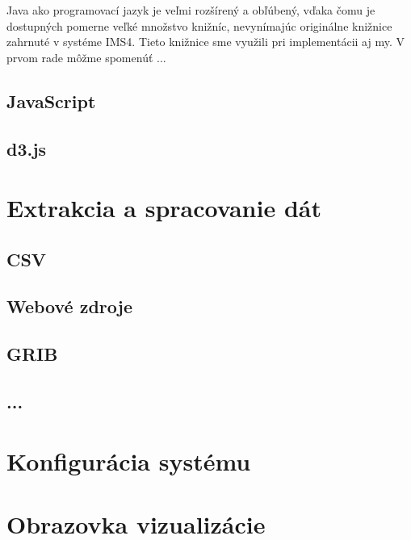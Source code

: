 Java ako programovací jazyk je veľmi rozšírený a obľúbený, vďaka čomu je dostupných pomerne veľké množstvo knižníc, nevynímajúc originálne knižnice zahrnuté v systéme IMS4. Tieto knižnice sme využili pri implementácii aj my. V prvom rade môžme spomenúť ... %


\subsection{JavaScript}

\subsection{d3.js}



\section{Extrakcia a spracovanie dát}

\subsection{CSV}

\subsection{Webové zdroje}

\subsection{GRIB}

\subsection{...}

\section{Konfigurácia systému}


\section{Obrazovka vizualizácie}
